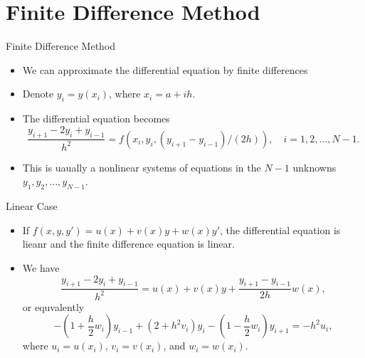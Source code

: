 \documentclass{beamer}
\begin{document}
\section{Finite Difference Method}
\begin{frame}{Finite Difference Method}
\begin{itemize}
    \item We can approximate the differential equation by finite differences
    \item Denote $y_i=y(x_i)$, where $x_i=a+ih$.
    \item The differential equation becomes 
    \[
    \frac{y_{i+1} - 2y_i + y_{i-1}}{h^2} = f(x_i, y_i, (y_{i+1} - y_{i-1})/(2h)), \quad i=1, 2, \ldots, N-1.
    \]
   \item This is uaually a nonlinear systems of equations in the $N-1$ unknowns $y_1, y_2, \ldots, y_{N-1}$.
\end{itemize}
\end{frame}
\begin{frame}{Linear Case}
    \begin{itemize}
        \item If $f(x,y,y')=u(x)+v(x)y+w(x)y'$, the differential equation is lieanr and the finite difference equation is linear.
        \item We have 
        \[
            \frac{y_{i+1} - 2y_i + y_{i-1}}{h^2} = u(x)+v(x)y+\frac{y_{i+1} - y_{i-1}}{2h}w(x),
        \]
        or equvalently
        \[
            -\left(1+\frac{h}{2} w_i\right)
             y_{i-1}+\left(2+h^2 v_i\right) y_i-\left(1-\frac{h}{2} w_i\right) y_{i+1}=-h^2 u_i,
        \]
        where $u_i=u(x_i)$, $v_i=v(x_i)$, and $w_i=w(x_i)$.
    \end{itemize}
\end{frame}
\end{document}
